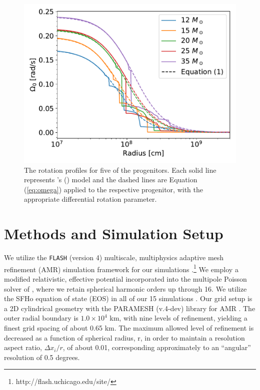 \documentclass[twocolumn,times]{aastex62}  %
\begin{document}
\begin{figure}[t]
    \centering
    \includegraphics[scale=0.45]{figures/omega_vs_r.pdf}
    \caption{The rotation profiles for five of the \citet{heger:2005} progenitors.  Each solid line represents \citeauthor{heger:2005}'s (\citeyear{heger:2005}) model and the dashed lines are Equation (\ref{eq:omega}) applied to the respective progenitor, with the appropriate differential rotation parameter.  }
    \label{fig:ovsr}
\end{figure}

\section{Methods and Simulation Setup}
\label{sec:method}
We utilize the \texttt{FLASH} (version 4) multiscale, multiphysics adaptive mesh refinement (AMR) simulation framework for our simulations \citep{fryxell:2000,dubey:2009}.\footnote{http://flash.uchicago.edu/site/}  We employ a modified relativistic, effective potential \citep{marek:2006, oconnor:2018} incorporated into the multipole Poisson solver of \citet{couch:2013a}, where we retain spherical harmonic orders up through 16.   We utilize the SFHo equation of state (EOS) in all of our 15 simulations \citep{steiner:2013}.  Our grid setup is a 2D cylindrical geometry with the PARAMESH (v.4-dev) library for AMR  \citep{macneice:2000}.  The outer radial boundary is $1.0 \times 10^4$ km, with nine levels of refinement, yielding a finest grid spacing of about 0.65 km.
The maximum allowed level of refinement is decreased as a function of spherical radius, r, in order to maintain a resolution aspect ratio, $\Delta x_i / r$, of about 0.01, corresponding approximately to an ``angular'' resolution of 0.5 degrees.
\end{document}
